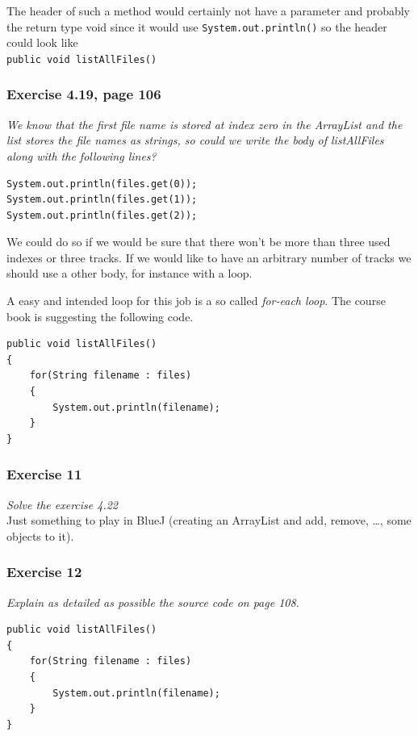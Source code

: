 The header of such a method would certainly not have a parameter and
probably the return type void since it would use
\lstinline{System.out.println()} so the header could look like \\

\lstinline{public void listAllFiles()}

\subsubsection*{Exercise 4.19, page 106}
\textit{We know that the first file name is stored at index zero in the
ArrayList and the list stores the file names as strings, so could we write
the body of listAllFiles along with the following lines?}
\begin{lstlisting}
System.out.println(files.get(0));
System.out.println(files.get(1));
System.out.println(files.get(2));
\end{lstlisting}

We could do so if we would be sure that there won't be more than three
used indexes or three tracks. If we would like to have an arbitrary number
of tracks we should use a other body, for instance with a loop.

A easy and intended loop for this job is a so called \textit{for-each loop}.
The course book is suggesting the following code.

\begin{lstlisting}
public void listAllFiles()
{
	for(String filename : files)
	{
		System.out.println(filename);
	}
}
\end{lstlisting}

\subsubsection*{Exercise 11}
\textit{Solve the exercise 4.22}\\

Just something to play in BlueJ (creating an ArrayList and add, remove, \dots,
some objects to it).

\subsubsection*{Exercise 12}
\textit{Explain as detailed as possible the source code on page 108.}\\

\begin{lstlisting}
public void listAllFiles()
{
	for(String filename : files)
	{
		System.out.println(filename);
	}
}
\end{lstlisting}

